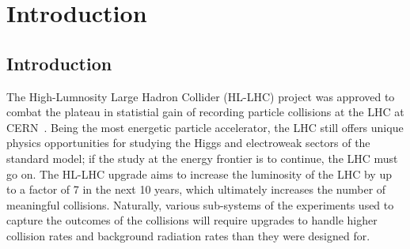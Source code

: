 
\chapter{Introduction}
\label{chap:intro}


\section{Introduction}

The High-Lumnosity Large Hadron Collider (HL-LHC) project was approved to combat the plateau in statistial gain of recording particle collisions at the LHC at CERN~\cite{hl_lhc_tdr}. Being the most energetic particle accelerator, the LHC still offers unique physics opportunities for studying the Higgs and electroweak sectors of the standard model\cite{dainese_physics_2018}; if the study at the energy frontier is to continue, the LHC must go on. The HL-LHC upgrade aims to increase the luminosity of the LHC by up to a factor of 7 in the next 10 years, which ultimately increases the number of meaningful collisions. Naturally, various sub-systems of the experiments used to capture the outcomes of the collisions will require upgrades to handle higher collision rates and background radiation rates than they were designed for. 

